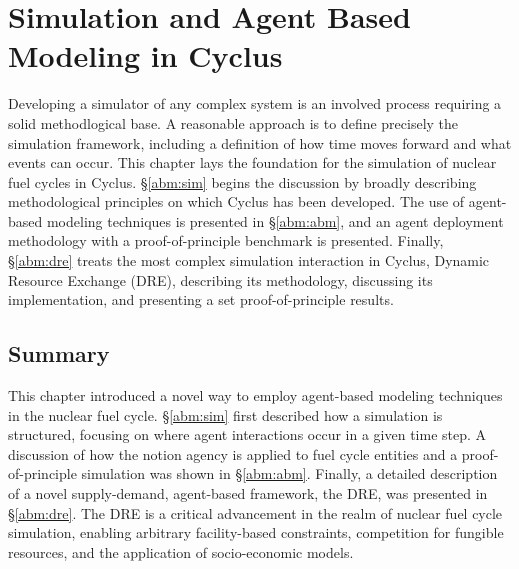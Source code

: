 \chapter{Simulation and Agent Based Modeling in Cyclus}\label{ch:abm}

Developing a simulator of any complex system is an involved process requiring a
solid methodlogical base. A reasonable approach is to define precisely the
simulation framework, including a definition of how time moves forward and what
events can occur. This chapter lays the foundation for the simulation of nuclear
fuel cycles in Cyclus. \S \ref{abm:sim} begins the discussion by broadly
describing methodological principles on which Cyclus has been developed. The use
of agent-based modeling techniques is presented in \S \ref{abm:abm}, and an
agent deployment methodology with a proof-of-principle benchmark is
presented. Finally, \S \ref{abm:dre} treats the most complex simulation
interaction in Cyclus, Dynamic Resource Exchange (DRE), describing its
methodology, discussing its implementation, and presenting a set
proof-of-principle results.







\section{Summary}

This chapter introduced a novel way to employ agent-based modeling techniques in
the nuclear fuel cycle. \S \ref{abm:sim} first described how a simulation is
structured, focusing on where agent interactions occur in a given time step. A
discussion of how the notion agency is applied to fuel cycle entities and a
proof-of-principle simulation was shown in \S \ref{abm:abm}. Finally, a detailed
description of a novel supply-demand, agent-based framework, the DRE, was
presented in \S \ref{abm:dre}. The DRE is a critical advancement in the realm of
nuclear fuel cycle simulation, enabling arbitrary facility-based constraints,
competition for fungible resources, and the application of socio-economic models.
